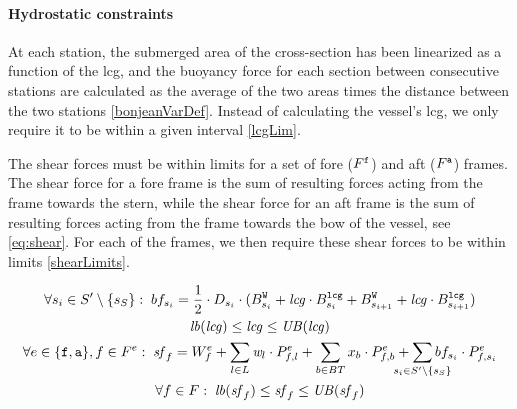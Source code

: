 \paragraph{Hydrostatic constraints}
At each station, the submerged area of the cross-section has been linearized as a function of the lcg, and the buoyancy force for each section between consecutive stations are calculated as the average of the two areas times the distance between the two stations \eqref{bonjeanVarDef}. 
Instead of calculating the vessel's lcg, we only require it to be within a given interval \eqref{lcgLim}.

The shear forces must be within limits for a set of fore ($F^{\texttt{f}}$) and aft ($F^{\texttt{a}}$) frames. The shear force for a fore frame is the sum of resulting forces acting from the frame towards the stern, while the shear force for an aft frame is the sum of resulting forces acting from the frame towards the bow of the vessel, see \eqref{eq:shear}. For each of the frames, we then require these shear forces to be within limits \eqref{shearLimits}.

\begin{gather}
\forall s_i \in S'\setminus\{s_S\}:\;
\bonjean_{s_i} = \frac{1}{2}\cdot D_{s_i}\cdot(\Bonj^\trt{W}_{s_i} + \mi{lcg}\cdot \Bonj^\trt{lcg}_{s_i}	+ \Bonj^\trt{W}_{s_{i+1}} + \mi{lcg}\cdot \Bonj^\trt{lcg}_{s_{i+1}})
\label{bonjeanVarDef}\\
%
\mi{lb}(\mi{lcg}) \leq \mi{lcg} \leq \mi{UB}(\mi{lcg})
\label{lcgLim}\\
%
\forall {e}\in\{\trt{f},\trt{a}\}, f \in \Sec^{e}:\;
\shear_f = W^{e}_f+ \sum_{l\in L} \weight_l\cdot \Prop_{f,l}^{e} + \sum_{b \in BT} x_b\cdot \Prop^{e}_{f,b} 	+ \smashoperator{\sum_{s_i \in S'\setminus\{s_S\}}}\bonjean_{s_i}\cdot \Prop^{e}_{f,s_i}
\label{eq:shear}\\
%
\forall f \in \Sec:\;	\mi{lb}(\shear_f)\leq	\shear_f \leq \mi{UB}(\shear_f)
\label{shearLimits}
\end{gather}
%
